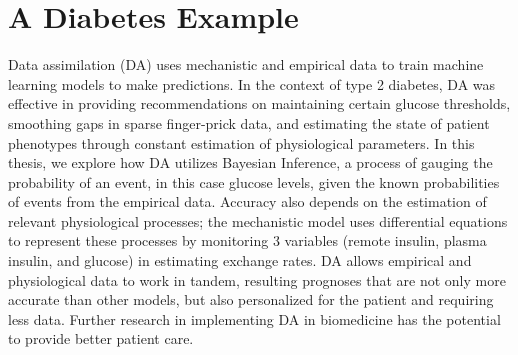 \chapter{A Diabetes Example}
\label{A Diabetes Example}

Data assimilation (DA) uses mechanistic and empirical data to train machine learning models to make predictions. In the context of type 2 diabetes, DA was effective in providing recommendations on maintaining certain glucose thresholds, smoothing gaps in sparse finger-prick data, and estimating the state of patient phenotypes through constant estimation of physiological parameters. In this thesis, we explore how DA utilizes Bayesian Inference, a process of gauging the probability of an event, in this case glucose levels, given the known probabilities of events from the empirical data. Accuracy also depends on the estimation of relevant physiological processes; the mechanistic model uses differential equations to represent these processes by monitoring 3 variables (remote insulin, plasma insulin, and glucose) in estimating exchange rates. DA allows empirical and physiological data to work in tandem, resulting prognoses that are not only more accurate than other models, but also personalized for the patient and requiring less data. Further research in implementing DA in biomedicine has the potential to provide better patient care.